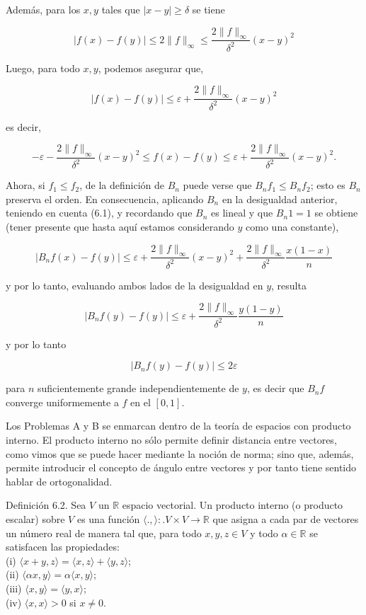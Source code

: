 \documentclass[10pt]{book}
\begin{document}
Además, para los $x, y$ tales que $|x-y| \geq \delta$ se tiene

$$
|f(x)-f(y)| \leq 2\|f\|_{\infty} \leq \frac{2\|f\|_{\infty}}{\delta^{2}}(x-y)^{2}
$$

Luego, para todo $x, y$, podemos asegurar que,

$$
|f(x)-f(y)| \leq \varepsilon+\frac{2\|f\|_{\infty}}{\delta^{2}}(x-y)^{2}
$$

es decir,

$$
-\varepsilon-\frac{2\|f\|_{\infty}}{\delta^{2}}(x-y)^{2} \leq f(x)-f(y) \leq \varepsilon+\frac{2\|f\|_{\infty}}{\delta^{2}}(x-y)^{2} .
$$

Ahora, si $f_{1} \leq f_{2}$, de la definición de $B_{n}$ puede verse que $B_{n} f_{1} \leq B_{n} f_{2}$; esto es $B_{n}$ preserva el orden. En consecuencia, aplicando $B_{n}$ en la desigualdad anterior, teniendo en cuenta (6.1), y recordando que $B_{n}$ es lineal y que $B_{n} 1=1$ se obtiene (tener presente que hasta aquí estamos considerando $y$ como una constante),

$$
\left|B_{n} f(x)-f(y)\right| \leq \varepsilon+\frac{2\|f\|_{\infty}}{\delta^{2}}(x-y)^{2}+\frac{2\|f\|_{\infty}}{\delta^{2}} \frac{x(1-x)}{n}
$$

y por lo tanto, evaluando ambos lados de la desigualdad en $y$, resulta

$$
\left|B_{n} f(y)-f(y)\right| \leq \varepsilon+\frac{2\|f\|_{\infty}}{\delta^{2}} \frac{y(1-y)}{n}
$$

y por lo tanto

$$
\left|B_{n} f(y)-f(y)\right| \leq 2 \varepsilon
$$

para $n$ suficientemente grande independientemente de $y$, es decir que $B_{n} f$ converge uniformemente a $f$ en el $[0,1]$.

Los Problemas A y B se enmarcan dentro de la teoría de espacios con producto interno. El producto interno no sólo permite definir distancia entre vectores, como vimos que se puede hacer mediante la noción de norma; sino que, además, permite introducir el concepto de ángulo entre vectores y por tanto tiene sentido hablar de ortogonalidad.

Definición 6.2. Sea $V$ un $\mathbb{R}$ espacio vectorial. Un producto interno (o producto escalar) sobre $V$ es una función $\langle.,\rangle:. V \times V \rightarrow \mathbb{R}$ que asigna a cada par de vectores un número real de manera tal que, para todo $x, y, z \in V$ y todo $\alpha \in \mathbb{R}$ se satisfacen las propiedades:\\
(i) $\langle x+y, z\rangle=\langle x, z\rangle+\langle y, z\rangle$;\\
(ii) $\langle\alpha x, y\rangle=\alpha\langle x, y\rangle$;\\
(iii) $\langle x, y\rangle=\langle y, x\rangle$;\\
(iv) $\langle x, x\rangle>0$ si $x \neq 0$.
\end{document}

